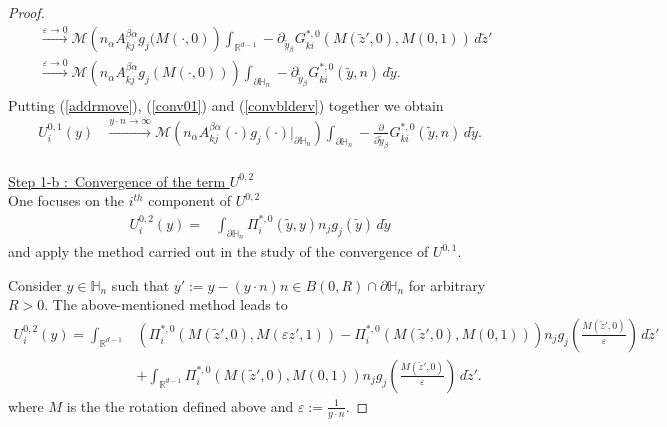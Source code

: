 \documentclass[11pt, reqno]{amsart}
\theoremstyle{definition}
\theoremstyle{remark}
\numberwithin{equation}{section}
\begin{document}
\begin{proof}[Proof]
\begin{align}
			&\xrightarrow{\varepsilon\rightarrow 0}\mathcal{M} \left(  n_\alpha A^{\beta\alpha}_{kj} g_j(M(\cdot ,0)\right)\int_{\mathbb{R}^{d-1}} - \partial_{\tilde{y}_\beta} G^{*,0}_{ki} \left(M(\tilde{z}',0),M (0,1) \right) \,d\tilde{z}'\nonumber\\
			&\xrightarrow{\varepsilon\rightarrow 0} \mathcal{M} \left( n_\alpha A^{\beta\alpha}_{kj} g_j(M(\cdot ,0))\right)\int_{\partial\mathbb{H}_n}- \partial_{ \tilde{y}_\beta} G^{*,0}_{ki} \left(\tilde{y},n\right) \,d\tilde{y}\label{convblderv}.\\ \nonumber
		\end{align}
		 Putting (\ref{addrmove}), (\ref{conv01}) and (\ref{convblderv}) together we obtain
		\begin{align}\label{convblp1}
			U_i^{0,1} ( y) 
			&\xrightarrow{y\cdot n\rightarrow \infty} \mathcal{M} \left(  n_\alpha A^{\beta\alpha}_{kj}(\cdot) g_j(\cdot)|_{\partial\mathbb{H}_n}  \right)\!\!\int_{\partial\mathbb{H}_n}\!\!\!\! - \frac{\partial}{\partial \tilde{y}_\beta} G^{*,0}_{ki} \left(\tilde{y},n\right) \,d\tilde{y}.\\ \nonumber
		\end{align}
		
	\noindent	\underline{Step 1-b :\, Convergence of the term $U^{0,2}$}\\
	\noindent One focuses on the $i^{th}$ component of $U^{0,2}$
		\begin{align*}
			U_i^{0,2}(y)
			=&  \int_{\partial\mathbb{H}_n}   \Pi_i^{*,0}(\tilde{y}, y) n_j g_j(\tilde{y})\,d\tilde{y} 
		\end{align*}
		and apply the method  carried out in the study of the convergence of $U^{0,1}$.
		
		\noindent Consider $y\in\mathbb{H}_n $  such that $y':=y-(y\cdot n)n \in B(0,R) \cap\partial\mathbb{H}_n$ for arbitrary $R>0$.
		The above-mentioned method  leads to 
		\begin{align}\label{addremove1}
			U_i^{0,2}(y)
			=\int_{\mathbb{R}^{d-1}} &\left( \Pi^{*,0}_i\left(M(\tilde{z}',0),M (\varepsilon z',1) \right) -  \Pi^{*,0}_i \left(M(\tilde{z}',0),M (0,1) \right) \right) n_j g_j\left(\frac{M(\tilde{z}',0)}{\varepsilon }\right)\,d\tilde{z}' \nonumber \\
			&	+\int_{\mathbb{R}^{d-1}} \Pi^{*,0}_i \left(M(\tilde{z}',0),M (0,1) \right) n_j g_j\left(\frac{M(\tilde{z}',0)}{\varepsilon }\right)\,d\tilde{z}'.\nonumber
		\end{align}
		where $M$ is the the rotation defined above and $\varepsilon := \frac{1}{y\cdot n}$. 
		

\end{proof}
\end{document}
